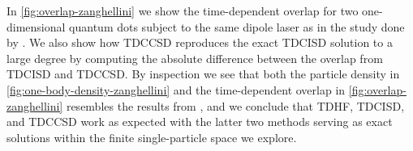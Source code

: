         In \autoref{fig:overlap-zanghellini} we show the
        time-dependent overlap for two one-dimensional quantum dots subject
        to the same dipole laser as in the study done by
        \citeauthor{zanghellini_2004} \cite{zanghellini_2004}.
        We also show how TDCCSD reproduces the exact TDCISD solution to a large
        degree by computing the absolute difference between the overlap from
        TDCISD and TDCCSD.
        By inspection we see that both the particle density in
        \autoref{fig:one-body-density-zanghellini} and the time-dependent
        overlap in \autoref{fig:overlap-zanghellini} resembles the results from
        \citeauthor{zanghellini_2004} \cite{zanghellini_2004}, and we conclude
        that TDHF, TDCISD, and TDCCSD work as expected with the latter two
        methods serving as exact solutions within the finite single-particle
        space we explore.

